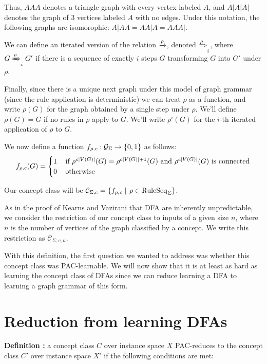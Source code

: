 \documentclass[]{article}
\def\RuleSeq{\mathrm{RuleSeq}\xspace}
\def\Graphs{\mathcal{G}\xspace}
\def\Concepts{\mathcal{C}\xspace}
\begin{document}
Thus, $AAA$ denotes a triangle graph with every vertex labeled $A$, and $A|A|A|$
denotes the graph of 3 vertices labeled $A$ with no edges. Under this notation,
the following graphs are isomorophic: $A|AA = AA|A = AAA|$.

We can define an iterated version of the relation $\xrightarrow{\rho}$, denoted
$\xRightarrow{\rho}_i$, where $G \xRightarrow{\rho}_i G'$ if there is a sequence of exactly
$i$ steps $G$ transforming $G$ into $G'$ under $\rho$.

Finally, since there is a unique next graph under this model of graph grammar
(since the rule application is deterministic) we can treat $\rho$ as a function,
and write $\rho(G)$ for the graph obtained by a single step under $\rho$. We'll
define $\rho(G) =G$ if no rules in $\rho$ apply to $G$. We'll write $\rho^i(G)$
for the $i$-th iterated application of $\rho$ to $G$.

We now define a function $f_{\rho,c} : \Graphs_{\Sigma} \to \Set{0,1}$ as follows:
\[f_{\rho,c}(G) = \begin{cases}
    1 &\,\text{if $\rho^{c\left| V(G) \right|}(G) = \rho^{c\left| V(G) \right|+1}(G)$ and $\rho^{c\left| V(G) \right|}(G)$ is connected}\\
    0 &\,\text{otherwise}
  \end{cases}\]

Our concept class will be
\(\Concepts_{\Sigma,c} = \Setbar{f_{\rho,c}}{\rho\in \RuleSeq_\Sigma}\).

As in the proof of Kearns and Vazirani that DFA are inherently unpredictable, we
consider the restriction of our concept class to inputs of a given size $n$,
where $n$ is the number of vertices of the graph classified by a concept. We
write this restriction as $\Concepts_{\Sigma,c,n}$.

With this definition, the first question we wanted to address was whether this
concept class was PAC-learnable. We will now show that it is at least as
hard as learning the concept class of DFAs since we can reduce learning a DFA to
learning a graph grammar of this form.

\section{Reduction from learning DFAs}

\textbf{Definition \cite{kearns1994}:} a concept class \(C\) over
instance space \(X\) PAC-reduces to the concept class \(C'\) over
instance space \(X'\) if the following conditions are met:
\end{document}
